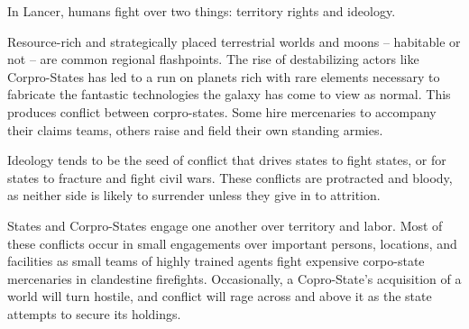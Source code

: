 In Lancer, humans fight over two things: territory rights and ideology. 
 

Resource-rich and strategically placed terrestrial worlds and moons -- habitable or not -- are  
common regional flashpoints. The rise of destabilizing actors like Corpro-States has led to a run  
on planets rich with rare elements necessary to fabricate the fantastic technologies the galaxy  
has come to view as normal. This produces conflict between corpro-states. Some hire  
mercenaries to accompany their claims teams, others raise and field their own standing armies. 
 

Ideology tends to be the seed of conflict that drives states to fight states, or for states to fracture  
and fight civil wars. These conflicts are protracted and bloody, as neither side is likely to  
surrender unless they give in to attrition. 
 

States and Corpro-States engage one another over territory and labor. Most of these conflicts  
occur in small engagements over important persons, locations, and facilities as small teams of  
highly trained agents fight expensive corpo-state mercenaries in clandestine firefights.  
Occasionally, a Copro-State’s acquisition of a world will turn hostile, and conflict will rage across  
and above it as the state attempts to secure its holdings. 
 
